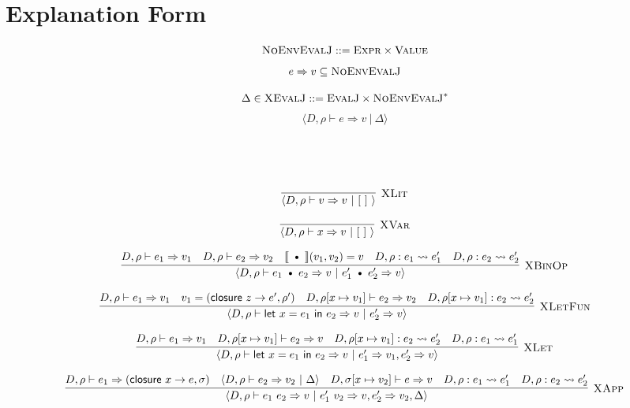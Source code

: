 \documentclass{article}
\def\codesf#1{\textsf{#1}}
\def\rt{\Rightarrow}
\def\binop{\ \text{\textbullet}\ }
\def\xj#1#2{\langle #1 \ | \ #2 \rangle}
\def\envj#1#2#3{D, #1 \vdash #2 \rt #3}
\def\noenvj#1#2{#1 \rt #2}
\begin{document}
\pagebreak
\section*{Explanation Form}

$$
\textsc{NoEnvEvalJ} ::=\textsc{Expr}\times\textsc{Value}
$$
$$
\noenvj{e}{v}\subseteq \textsc{NoEnvEvalJ}
$$

$$
\Delta\in \textsc{XEvalJ} ::= \textsc{EvalJ}\times \textsc{NoEnvEvalJ}^*
$$
$$
\xj{\envj{\rho}{e}{v}}{\Delta}
$$

\

\

\begin{figure*}[h]
$$
\infer[\textsc{XLit}]{
    \langle D, \rho \vdash v \Rightarrow v \ | \ [\ ] \ \rangle
}{}
$$

$$
\infer[\textsc{XVar}]{
    \langle D, \rho \vdash x \Rightarrow v \ | \ [\  ]\  \rangle
}{}
$$

$$
\infer[\textsc{XBinOp}]{
    \langle D, \rho \vdash e_1 \binop e_2 \Rightarrow v \ | \ e_1' \binop e_2' \Rightarrow v \rangle
}{
    D, \rho \vdash e_1 \Rightarrow v_1
    &
    D, \rho \vdash e_2 \Rightarrow v_2
    &
    \llbracket \binop \rrbracket(v_1, v_2) = v
    &
    D, \rho : e_1 \rightsquigarrow e_1'
    &
    D, \rho : e_2 \rightsquigarrow e_2'
}
$$

$$
\infer[\textsc{XLetFun}]{
    \langle D, \rho \vdash \codesf{let } x = e_1 \codesf{ in } e_2 \Rightarrow v \ | \ e_2' \Rightarrow v \rangle
}{
    D, \rho \vdash e_1 \Rightarrow v_1
    &
    v_1 = (\textsf{closure } z \to e', \rho')
    &
    D, \rho[x \mapsto v_1] \vdash e_2 \Rightarrow v_2
    &
    D, \rho[x \mapsto v_1] : e_2 \rightsquigarrow e_2'
}
$$

$$
\infer[\textsc{XLet}]{
    \langle D, \rho \vdash \codesf{let } x = e_1 \codesf{ in } e_2 \Rightarrow v \ | \ e_1' \Rightarrow v_1, e_2' \Rightarrow v \rangle
}{
    D, \rho \vdash e_1 \Rightarrow v_1
    &
    D, \rho[x \mapsto v_1] \vdash e_2 \Rightarrow v
    &
    D, \rho[x \mapsto v_1] : e_2 \rightsquigarrow e_2'
    &
    D, \rho : e_1 \rightsquigarrow e_1'
}
$$

$$
\infer[\textsc{XApp}]{
	\langle D, \rho \vdash e_1 \ e_2 \Rightarrow v \ | \ e_1' \ v_2 \Rightarrow v, e_2' \Rightarrow v_2, \Delta\rangle
}{
	D, \rho  \vdash e_1 \Rightarrow (\codesf{closure} \ x \to e,\sigma )
	&
	\xj{D, \rho \vdash e_2 \Rightarrow v_2}{\Delta}
	&
	D, \sigma[x \mapsto v_2] \vdash e \Rightarrow v
	&
	D,\rho: e_1 \rightsquigarrow e_1'
	&
	D,\rho : e_2 \rightsquigarrow e_2' 
}
$$


\end{figure*}
\end{document}
